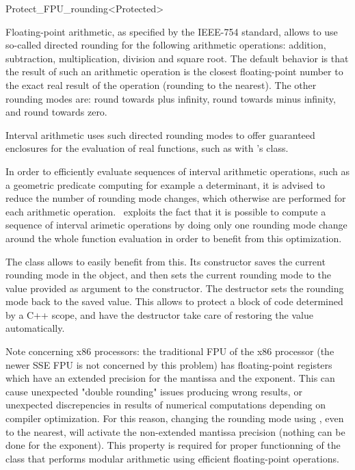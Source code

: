 
\begin{ccRefClass}{Protect_FPU_rounding<Protected>}
\label{protect_fpu_rouding}

\ccDefinition

Floating-point arithmetic, as specified by the IEEE-754 standard, allows to use
so-called directed rounding for the following arithmetic operations: addition,
subtraction, multiplication, division and square root.  The default behavior is
that the result of such an arithmetic operation is the closest floating-point
number to the exact real result of the operation (rounding to the nearest).
The other rounding modes are: round towards plus infinity, round towards minus
infinity, and round towards zero.

Interval arithmetic uses such directed rounding modes to offer guaranteed
enclosures for the evaluation of real functions, such as with \cgal's
 class.

In order to efficiently evaluate sequences of interval arithmetic operations,
such as a geometric predicate computing for example a determinant, it is
advised to reduce the number of rounding mode changes, which otherwise are
performed for each arithmetic operation.  \cgal\ exploits the fact that it is
possible to compute a sequence of interval arimetic operations by doing only
one rounding mode change around the whole function evaluation in order to
benefit from this optimization.

The class  allows to easily benefit from this.
Its constructor saves the current rounding mode in the object, and then sets
the current rounding mode to the value provided as argument to the constructor.
The destructor sets the rounding mode back to the saved value.
This allows to protect a block of code determined by a C++ scope, and have
the destructor take care of restoring the value automatically.

Note concerning x86 processors: the traditional FPU of the x86 processor (the
newer SSE FPU is not concerned by this problem) has floating-point registers
which have an extended precision for the mantissa and the exponent.  This
can cause unexpected "double rounding" issues producing wrong results, or
unexpected discrepencies in results of numerical computations depending on
compiler optimization.  For this reason, changing the rounding mode using
, even to the nearest, will activate the non-extended
mantissa precision (nothing can be done for the exponent).  This property is
required for proper functionning of the  class that performs
modular arithmetic using efficient floating-point operations.


\end{ccRefClass}
